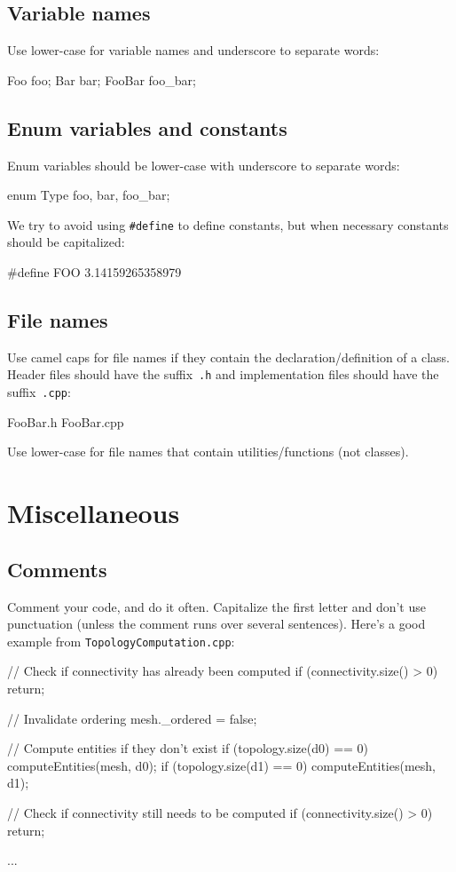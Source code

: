 \subsection{Variable names}

Use lower-case for variable names and underscore to separate words:
\begin{code}
Foo foo;
Bar bar;
FooBar foo_bar;
\end{code}

\subsection{Enum variables and constants}

Enum variables should be lower-case with underscore to separate words:
\begin{code}
enum Type {foo, bar, foo_bar};
\end{code}

We try to avoid using \texttt{\#define} to define constants, but when
necessary constants should be capitalized:
\begin{code}
#define FOO 3.14159265358979
\end{code}

\subsection{File names}

Use camel caps for file names if they contain the
declaration/definition of a class. Header files should have the
suffix~\texttt{.h} and implementation files should have the
suffix~\texttt{.cpp}:
\begin{code}
FooBar.h
FooBar.cpp
\end{code}

Use lower-case for file names that contain utilities/functions (not
classes).

\section{Miscellaneous}

\subsection{Comments}

Comment your code, and do it often. Capitalize the first letter and
don't use punctuation (unless the comment runs over several
sentences). Here's a good example from \texttt{TopologyComputation.cpp}:
\begin{code}
// Check if connectivity has already been computed
if (connectivity.size() > 0)
  return;

// Invalidate ordering
mesh._ordered = false;

// Compute entities if they don't exist
if (topology.size(d0) == 0)
  computeEntities(mesh, d0);
if (topology.size(d1) == 0)
  computeEntities(mesh, d1);

// Check if connectivity still needs to be computed
if (connectivity.size() > 0)
  return;

...
\end{code}

